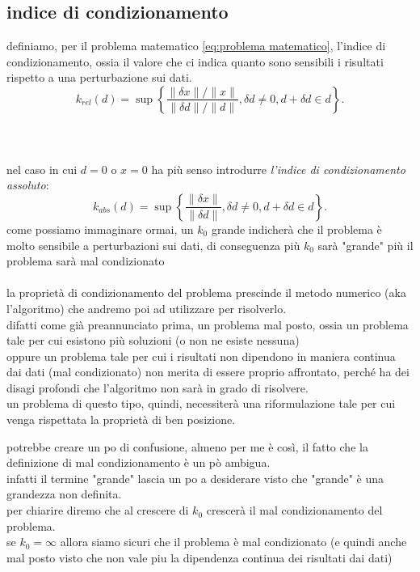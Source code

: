 \documentclass{article}
\begin{document}
\subsection{indice di condizionamento}
definiamo, per il problema matematico \eqref{eq:problema matematico}, l'indice di condizionamento, ossia il valore che ci indica quanto sono sensibili i risultati rispetto a una perturbazione sui dati. 
\begin{equation}
  k_{rel}(d)=\sup\left\{\frac{\|\delta x\|/\|x\|}{\|\delta d\|/\|d\|},\delta d\neq0,d+\delta d\in d\right\}. 
\end{equation} \\ \\ \\
nel caso in cui $d = 0$ o $x=0$ ha più senso introdurre \textit{l'indice di condizionamento assoluto}:
\begin{equation}
  k_{abs}(d)=\sup\left\{\frac{\|\delta x\|}{\|\delta d\|},\delta d\neq0,d+\delta d\in d\right\}. 
\end{equation}
come possiamo immaginare ormai, un $k_0$ grande indicherà che il problema è molto sensibile a perturbazioni sui dati, di conseguenza più $k_0$ sarà "grande" più il problema sarà mal condizionato\\ \\
la proprietà di condizionamento del problema prescinde il metodo numerico (aka l'algoritmo) che andremo poi ad utilizzare per risolverlo.\\ 
difatti come già preannunciato prima, un problema mal posto, ossia un problema tale per cui esistono più soluzioni (o non ne esiste nessuna) \\ 
oppure un problema tale per cui i risultati non dipendono in maniera continua dai dati (mal condizionato)
non merita di essere proprio affrontato, perché ha dei disagi profondi che l'algoritmo non sarà in grado di risolvere. \\
un problema di questo tipo, quindi, necessiterà una riformulazione tale per cui venga rispettata la proprietà di ben posizione. \\

\begin{tcolorbox}[colback=white,colframe=black,title=nota]
  potrebbe creare un po di confusione, almeno per me è così, il fatto che la definizione di mal condizionamento è un pò ambigua.\\ 
  infatti il termine "grande" lascia un po a desiderare visto che "grande" è una grandezza non definita.\\ 
  per chiarire diremo che al crescere di $k_0$ crescerà il mal condizionamento del problema.\\ 
  se $k_0 = \infty$ allora siamo sicuri che il problema è mal condizionato (e quindi anche mal posto visto che non vale piu la dipendenza continua dei risultati dai dati) 
\end{tcolorbox} 
\end{document}
